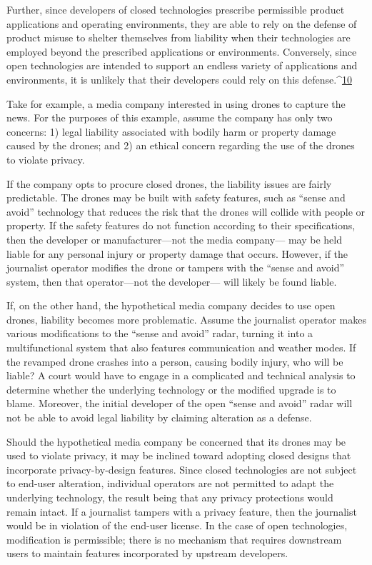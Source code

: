 \begin{itemize}
Further, since developers of closed technologies prescribe permissible product
applications and operating environments, they are able to rely on the
defense of product misuse to shelter themselves from liability when their
technologies are employed beyond the prescribed applications or environments.
Conversely, since open technologies are intended to support an
endless variety of applications and environments, it is unlikely that their
developers could rely on this defense.^{\href{#endnotes-cooper}{10}}

Take for example, a media company interested in using drones to capture
the news. For the purposes of this example, assume the company has only two concerns: 1) legal liability associated with bodily harm or property
damage caused by the drones; and 2) an ethical concern regarding the use
of the drones to violate privacy.

If the company opts to procure closed drones, the liability issues are fairly
predictable. The drones may be built with safety features, such as ``sense
and avoid'' technology that reduces the risk that the drones will collide with
people or property. If the safety features do not function according to their
specifications, then the developer or manufacturer—not the media company—
may be held liable for any personal injury or property damage that
occurs. However, if the journalist operator modifies the drone or tampers
with the ``sense and avoid'' system, then that operator—not the developer—
will likely be found liable.

If, on the other hand, the hypothetical media company decides to use open
drones, liability becomes more problematic. Assume the journalist operator
makes various modifications to the ``sense and avoid'' radar, turning it into
a multifunctional system that also features communication and weather
modes. If the revamped drone crashes into a person, causing bodily injury,
who will be liable? A court would have to engage in a complicated and technical
analysis to determine whether the underlying technology or the modified
upgrade is to blame. Moreover, the initial developer of the open ``sense
and avoid'' radar will not be able to avoid legal liability by claiming alteration
as a defense.

Should the hypothetical media company be concerned that its drones may
be used to violate privacy, it may be inclined toward adopting closed designs
that incorporate privacy-by-design features. Since closed technologies are
not subject to end-user alteration, individual operators are not permitted to
adapt the underlying technology, the result being that any privacy protections
would remain intact. If a journalist tampers with a privacy feature,
then the journalist would be in violation of the end-user license. In the case of open technologies, modification is permissible; there is no mechanism
that requires downstream users to maintain features incorporated by
upstream developers.


\end{itemize}
